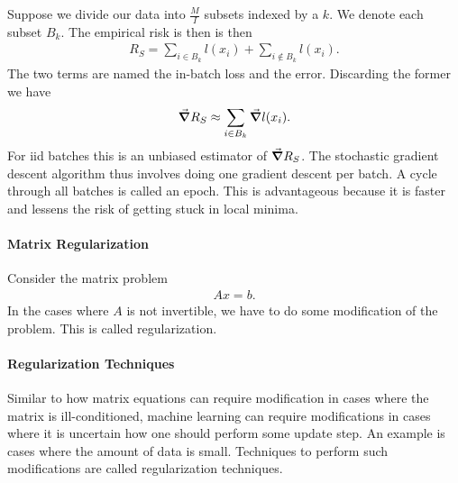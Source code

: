 Suppose we divide our data into $\frac{M}{I}$ subsets indexed by a $k$. We denote each subset $B_{k}$. The empirical risk is then is then
\begin{align*}
	R_{S} = \sum\limits_{i\in B_{k}}l(x_{i}) + \sum\limits_{i\notin B_{k}}l(x_{i}).
\end{align*}
The two terms are named the in-batch loss and the error. Discarding the former we have
\begin{align*}
	\grad R_{S} \approx \sum\limits_{i\in B_{k}}\grad l(x_{i}).
\end{align*}
For iid batches this is an unbiased estimator of $\grad R_{S}$. The stochastic gradient descent algorithm thus involves doing one gradient descent per batch. A cycle through all batches is called an epoch. This is advantageous because it is faster and lessens the risk of getting stuck in local minima.

\paragraph{Matrix Regularization}
Consider the matrix problem
\begin{align*}
	Ax = b.
\end{align*}
In the cases where $A$ is not invertible, we have to do some modification of the problem. This is called regularization.

\paragraph{Regularization Techniques}
Similar to how matrix equations can require modification in cases where the matrix is ill-conditioned, machine learning can require modifications in cases where it is uncertain how one should perform some update step. An example is cases where the amount of data is small. Techniques to perform such modifications are called regularization techniques.